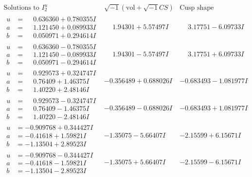\documentclass[1p]{elsarticle_modified}
\theoremstyle{definition}
\newcommand{\I}{\sqrt{-1}}
\begin{document}
$$\begin{array}{c|c|c}  
\text{Solutions to }I^u_{2}& \I (\text{vol} + \sqrt{-1}CS) & \text{Cusp shape}\\
 \hline 
\begin{aligned}
u &= \phantom{-}0.636360 + 0.780355 I \\
a &= \phantom{-}1.121450 + 0.089933 I \\
b &= \phantom{-}0.050971 + 0.294614 I\end{aligned}
 & \phantom{-}1.94301 + 5.57497 I & \phantom{-}3.17751 - 6.09733 I \\ \hline\begin{aligned}
u &= \phantom{-}0.636360 - 0.780355 I \\
a &= \phantom{-}1.121450 - 0.089933 I \\
b &= \phantom{-}0.050971 - 0.294614 I\end{aligned}
 & \phantom{-}1.94301 - 5.57497 I & \phantom{-}3.17751 + 6.09733 I \\ \hline\begin{aligned}
u &= \phantom{-}0.929573 + 0.324747 I \\
a &= \phantom{-}0.76409 + 1.46375 I \\
b &= \phantom{-}1.40220 + 2.48146 I\end{aligned}
 & -0.356489 + 0.688026 I & -0.683493 - 1.081977 I \\ \hline\begin{aligned}
u &= \phantom{-}0.929573 - 0.324747 I \\
a &= \phantom{-}0.76409 - 1.46375 I \\
b &= \phantom{-}1.40220 - 2.48146 I\end{aligned}
 & -0.356489 - 0.688026 I & -0.683493 + 1.081977 I \\ \hline\begin{aligned}
u &= -0.909768 + 0.344427 I \\
a &= -0.41618 + 1.59821 I \\
b &= -1.13504 + 2.89523 I\end{aligned}
 & -1.35075 - 5.66407 I & -2.15599 + 6.15671 I \\ \hline\begin{aligned}
u &= -0.909768 - 0.344427 I \\
a &= -0.41618 - 1.59821 I \\
b &= -1.13504 - 2.89523 I\end{aligned}
 & -1.35075 + 5.66407 I & -2.15599 - 6.15671 I \\ \hline\begin{aligned}

\end{aligned}
\end{array}$$
\end{document}
